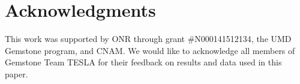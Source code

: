 \section*{Acknowledgments}
This work was supported by ONR through grant \#N000141512134, the UMD Gemstone
program, and CNAM. 
%
We would like to acknowledge all members of Gemstone Team TESLA for their
feedback on results and data used in this paper.
